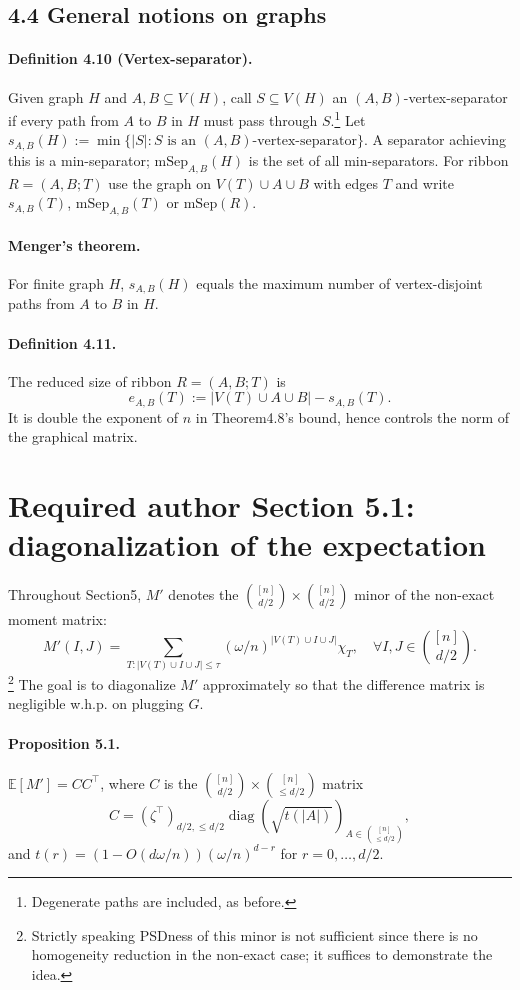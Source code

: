 \documentclass[10pt,a4paper]{article}
\begin{document}
\subsection*{4.4 General notions on graphs}
\paragraph{Definition 4.10 (Vertex-separator).} Given graph $H$ and $A,B\subseteq V(H)$, call $S\subseteq V(H)$ an $(A,B)$-vertex-separator if every path from $A$ to $B$ in $H$ must pass through $S$.\footnote{Degenerate paths are included, as before.} Let $s_{A,B}(H):=\min\{|S|:S\text{ is an }(A,B)\text{-vertex-separator}\}$. A separator achieving this is a min-separator; $\mathrm{mSep}_{A,B}(H)$ is the set of all min-separators. For ribbon $R=(A,B;T)$ use the graph on $V(T)\cup A\cup B$ with edges $T$ and write $s_{A,B}(T)$, $\mathrm{mSep}_{A,B}(T)$ or $\mathrm{mSep}(R)$.
\paragraph{Menger's theorem.} For finite graph $H$, $s_{A,B}(H)$ equals the maximum number of vertex-disjoint paths from $A$ to $B$ in $H$.
\paragraph{Definition 4.11.} The reduced size of ribbon $R=(A,B;T)$ is\[e_{A,B}(T):=|V(T)\cup A\cup B|-s_{A,B}(T).\tag{4.8}\]
It is double the exponent of $n$ in Theorem4.8's bound, hence controls the norm of the graphical matrix.

\section*{Required author Section 5.1: diagonalization of the expectation}
Throughout Section5, $M'$ denotes the $\binom{[n]}{d/2}\times\binom{[n]}{d/2}$ minor of the non-exact moment matrix:
\[M'(I,J)=\sum_{T:|V(T)\cup I\cup J|\le\tau}(\omega/n)^{|V(T)\cup I\cup J|}\chi_T,\quad\forall I,J\in\binom{[n]}{d/2}.\tag{5.1}\]
\footnote{Strictly speaking PSDness of this minor is not sufficient since there is no homogeneity reduction in the non-exact case; it suffices to demonstrate the idea.} The goal is to diagonalize $M'$ approximately so that the difference matrix is negligible w.h.p. on plugging $G$.
\paragraph{Proposition 5.1.} $\mathbb E[M']=CC^\top$, where $C$ is the $\binom{[n]}{d/2}\times\binom{[n]}{\le d/2}$ matrix
\[C=(\zeta^\top)_{d/2,\le d/2}\operatorname{diag}(\sqrt{t(|A|)})_{A\in\binom{[n]}{\le d/2}},\tag{5.2}\]
and $t(r)=(1-O(d\omega/n))(\omega/n)^{d-r}$ for $r=0,\ldots,d/2$.
\end{document}
